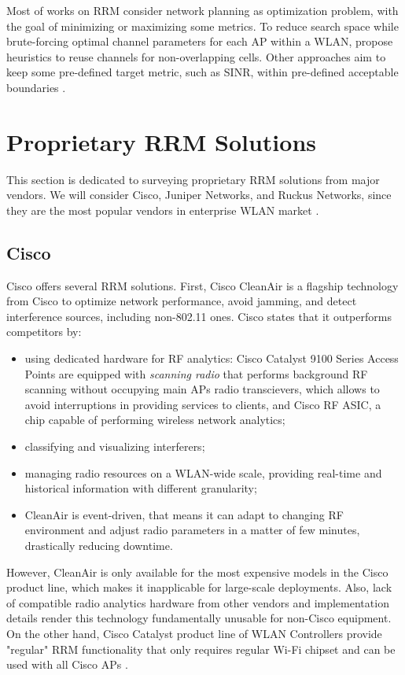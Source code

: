 Most of works on RRM consider \cite{bouhafsPerFlowRadioResource2020,levantiCAPWAPCompliantSolutionRadio2007} network planning as optimization problem, with the goal of minimizing or maximizing some metrics. To reduce search space while brute-forcing optimal channel parameters for each AP within a WLAN, \cite{levantiCAPWAPCompliantSolutionRadio2007} propose heuristics to reuse channels for non-overlapping cells. Other approaches aim to keep some pre-defined target metric, such as SINR, within pre-defined acceptable boundaries \cite{michalskiSimplePerformanceboostingAlgorithm2016}.

\section {Proprietary RRM Solutions}
\label{chap:lr:sec:prop_rrm}
This section is dedicated to surveying proprietary RRM solutions from major vendors. We will consider Cisco, Juniper Networks, and Ruckus Networks, since they are the most popular vendors in enterprise WLAN market \cite{WiFiMarketSize}.

\subsection{Cisco}
Cisco offers several RRM solutions.
First, Cisco CleanAir is a flagship technology from Cisco \cite{CiscoCleanAirTechnology2014} to optimize network performance, avoid jamming, and detect interference sources, including non-802.11 ones. Cisco states that it outperforms competitors by:
\begin{itemize}
    \item using dedicated hardware for RF analytics: Cisco Catalyst 9100 Series Access Points are equipped with \textit{scanning radio} that performs background RF scanning without occupying main APs radio transcievers, which allows to avoid interruptions in providing services to clients, and Cisco RF ASIC, a chip capable of performing wireless network analytics;
    \item classifying and visualizing interferers;
    \item managing radio resources on a WLAN-wide scale, providing real-time and historical information with different granularity;
    \item CleanAir is event-driven, that means it can adapt to changing RF environment and adjust radio parameters in a matter of few minutes, drastically reducing downtime.
\end{itemize}
However, CleanAir is only available for the most expensive models in the Cisco product line, which makes it inapplicable for large-scale deployments. Also, lack of compatible radio analytics hardware from other vendors and implementation details render this technology fundamentally unusable for non-Cisco equipment.
On the other hand, Cisco Catalyst product line of WLAN Controllers provide "regular" RRM functionality that only requires regular Wi-Fi chipset and can be used with all Cisco APs \cite{ciscoRadioResourceManagement}.

